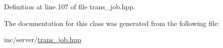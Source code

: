 Definition at line 107 of file trans\+\_\+job.\+hpp.



The documentation for this class was generated from the following file\+:\begin{DoxyCompactItemize}
\item 
inc/server/\hyperlink{server_2trans__job_8hpp}{trans\+\_\+job.\+hpp}\end{DoxyCompactItemize}
